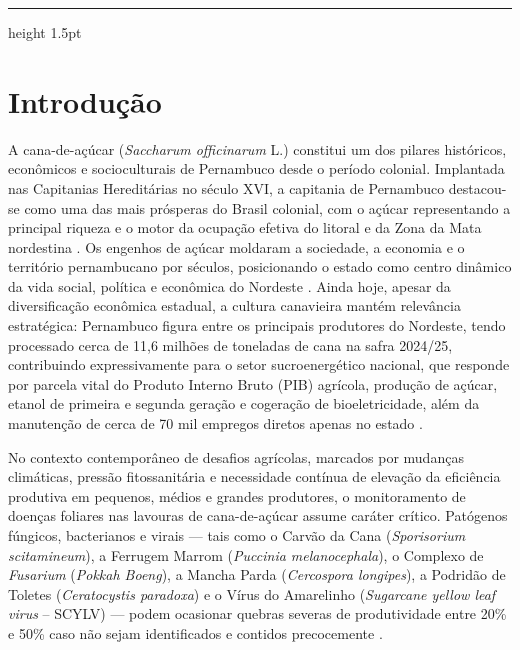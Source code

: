\documentclass[12pt]{article}
\begin{document}

\vspace*{20pt} \hrule height 1.5pt

\section{Introdução}

A cana-de-açúcar (\textit{Saccharum officinarum} L.) constitui um dos pilares históricos, econômicos e socioculturais de Pernambuco desde o período colonial. Implantada nas Capitanias Hereditárias no século XVI, a capitania de Pernambuco destacou-se como uma das mais prósperas do Brasil colonial, com o açúcar representando a principal riqueza e o motor da ocupação efetiva do litoral e da Zona da Mata nordestina \parencite{freyre2004}. Os engenhos de açúcar moldaram a sociedade, a economia e o território pernambucano por séculos, posicionando o estado como centro dinâmico da vida social, política e econômica do Nordeste \parencite{freyre2004,mello2007}. Ainda hoje, apesar da diversificação econômica estadual, a cultura canavieira mantém relevância estratégica: Pernambuco figura entre os principais produtores do Nordeste, tendo processado cerca de 11,6 milhões de toneladas de cana na safra 2024/25, contribuindo expressivamente para o setor sucroenergético nacional, que responde por parcela vital do Produto Interno Bruto (PIB) agrícola, produção de açúcar, etanol de primeira e segunda geração e cogeração de bioeletricidade, além da manutenção de cerca de 70 mil empregos diretos apenas no estado \parencite{conab2024cana,conab2025,sindacucar2024,santos2023}.

No contexto contemporâneo de desafios agrícolas, marcados por mudanças climáticas, pressão fitossanitária e necessidade contínua de elevação da eficiência produtiva em pequenos, médios e grandes produtores, o monitoramento de doenças foliares nas lavouras de cana-de-açúcar assume caráter crítico. Patógenos fúngicos, bacterianos e virais --- tais como o Carvão da Cana (\textit{Sporisorium scitamineum}), a Ferrugem Marrom (\textit{Puccinia melanocephala}), o Complexo de \textit{Fusarium} (\textit{Pokkah Boeng}), a Mancha Parda (\textit{Cercospora longipes}), a Podridão de Toletes (\textit{Ceratocystis paradoxa}) e o Vírus do Amarelinho (\textit{Sugarcane yellow leaf virus} -- SCYLV) --- podem ocasionar quebras severas de produtividade entre 20\% e 50\% caso não sejam identificados e contidos precocemente \parencite{mariano2023,barbedo2019review,conab2025}.
\end{document}
